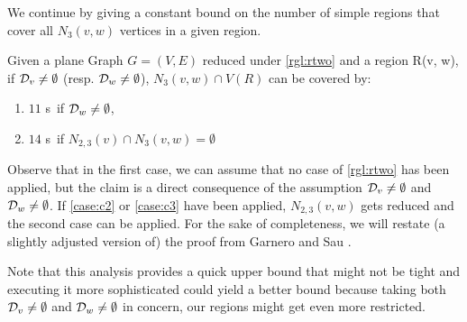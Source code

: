 We continue by giving a constant bound on the number of simple regions that cover all  $N_3(v,w)$ vertices in a given region.

\begin{lemma}\label{lemma:rtwosr}
    Given a plane Graph $G = (V,E)$ reduced under \cref{rgl:rtwo}  and a region R(v, w), if $\mathcal{D}_{v} \neq \emptyset $ (resp. $\mathcal{D}_{w} \neq \emptyset$), $N_3(v,w) \cap V(R)$ can be covered by: 
    \begin{enumerate}
        \item $11$ \sr s~if $\mathcal{D}_{w} \neq \emptyset$,
        \item $14$ \sr s~if $N_{2,3}(v) \cap N_3(v,w) = \emptyset$
    \end{enumerate}
\end{lemma}

Observe that in the first case, we can assume that no case of \cref{rgl:rtwo} has been applied, but the claim is a direct consequence of the assumption $\mathcal{D}_{v} \neq \emptyset$ and $\mathcal{D}_{w} \neq \emptyset$. If \cref{case:c2} or \cref{case:c3} have been applied, $N_{2,3}(v,w)$ gets reduced and the second case can be applied. For the sake of completeness, we will restate (a slightly adjusted version of) the proof from Garnero and Sau \cite[Revision 2014, Fact 6]{Garnero2018}. 

Note that this analysis provides a quick upper bound that might not be tight and executing it more sophisticated could yield a better bound because taking both $\mathcal{D}_{v} \neq \emptyset$ and $\mathcal{D}_{w} \neq \emptyset$ in concern, our regions might get even more restricted.

